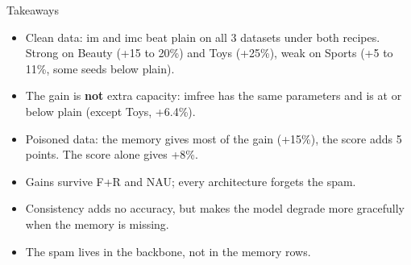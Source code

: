 \documentclass{beamer}
\begin{document}
\begin{frame}{Takeaways}
\begin{itemize}
  \item Clean data: im and imc beat plain on all 3 datasets under both
        recipes. Strong on Beauty (+15 to 20\%) and Toys (+25\%), weak on
        Sports (+5 to 11\%, some seeds below plain).
  \item The gain is \textbf{not} extra capacity: imfree has the same
        parameters and is at or below plain (except Toys, +6.4\%).
  \item Poisoned data: the memory gives most of the gain (+15\%), the score
        adds 5 points. The score alone gives +8\%.
  \item Gains survive F+R and NAU; every architecture forgets the spam.
  \item Consistency adds no accuracy, but makes the model degrade more
        gracefully when the memory is missing.
  \item The spam lives in the backbone, not in the memory rows.
\end{itemize}
\end{frame}
\end{document}
